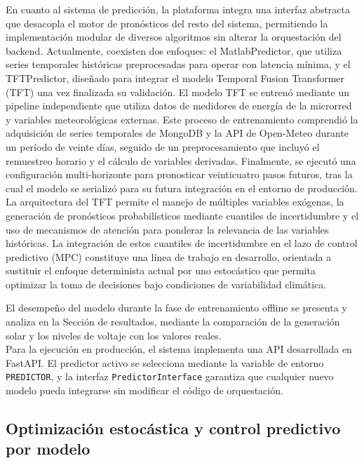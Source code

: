 \documentclass[journal,article,submit,pdftex,moreauthors]{Definitions/mdpi}
\begin{document}
En cuanto al sistema de predicción, la plataforma integra una interfaz abstracta que desacopla el motor de pronósticos del resto del sistema, permitiendo la implementación modular de diversos algoritmos sin alterar la orquestación del backend. Actualmente, coexisten dos enfoques: el MatlabPredictor, que utiliza series temporales históricas preprocesadas para operar con latencia mínima, y el TFTPredictor, diseñado para integrar el modelo Temporal Fusion Transformer (TFT) una vez finalizada su validación.
El modelo TFT se entrenó mediante un pipeline independiente que utiliza datos de medidores de energía de la microrred y variables meteorológicas externas. Este proceso de entrenamiento comprendió la adquisición de series temporales de MongoDB y la API de Open-Meteo durante un período de veinte días, seguido de un preprocesamiento que incluyó el remuestreo horario y el cálculo de variables derivadas. Finalmente, se ejecutó una configuración multi-horizonte para pronosticar veinticuatro pasos futuros, tras la cual el modelo se serializó para su futura integración en el entorno de producción.
\\
La arquitectura del TFT permite el manejo de múltiples variables exógenas, la generación de pronósticos probabilísticos mediante cuantiles de incertidumbre y el uso de mecanismos de atención para ponderar la relevancia de las variables históricas. La integración de estos cuantiles de incertidumbre en el lazo de control predictivo (MPC) constituye una línea de trabajo en desarrollo, orientada a sustituir el enfoque determinista actual por uno estocástico que permita optimizar la toma de decisiones bajo condiciones de variabilidad climática.

El desempeño del modelo durante la fase de entrenamiento offline se presenta y analiza en la Sección de resultados, mediante la comparación de la generación solar y los niveles de voltaje con los valores reales.
\\

Para la ejecución en producción, el sistema implementa una API desarrollada en FastAPI. El predictor activo se selecciona mediante la variable de entorno \texttt{PREDICTOR}, y la interfaz \texttt{PredictorInterface} garantiza que cualquier nuevo modelo pueda integrarse sin modificar el c\'odigo de orquestaci\'on.

\subsection{Optimizaci\'on estoc\'astica y control predictivo por modelo}
\end{document}
